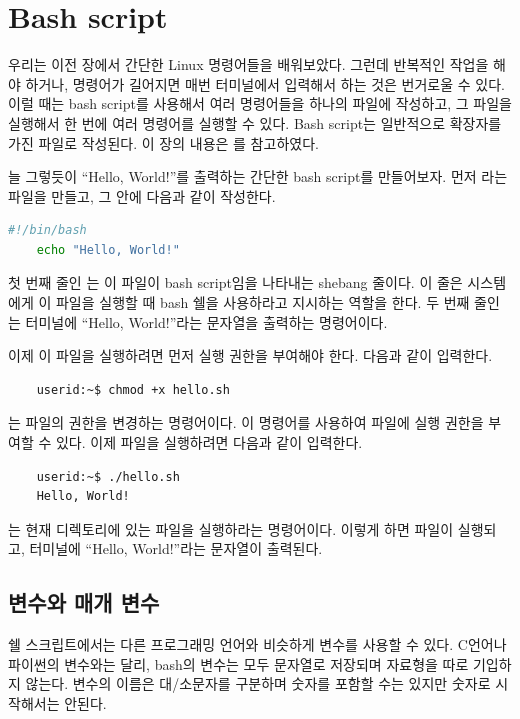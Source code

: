 {\section{Bash script}
우리는 이전 장에서 간단한 Linux 명령어들을 배워보았다. 그런데 반복적인 작업을 해야 하거나, 명령어가 길어지면 매번 터미널에서 입력해서 하는 것은 번거로울 수 있다. 이럴 때는 bash script를 사용해서 여러 명령어들을 하나의 파일에 작성하고, 그 파일을 실행해서 한 번에 여러 명령어를 실행할 수 있다. Bash script는 일반적으로  확장자를 가진 파일로 작성된다. 이 장의 내용은 \cite{inpa2022bash}를 참고하였다.

늘 그렇듯이 ``Hello, World!''를 출력하는 간단한 bash script를 만들어보자. 먼저 라는 파일을 만들고, 그 안에 다음과 같이 작성한다.
\begin{lstlisting}[language=bash, keywords={}]
    #!/bin/bash
    echo "Hello, World!"
\end{lstlisting}
첫 번째 줄인 는 이 파일이 bash script임을 나타내는 shebang 줄이다. 이 줄은 시스템에게 이 파일을 실행할 때 bash 쉘을 사용하라고 지시하는 역할을 한다. 두 번째 줄인 는 터미널에 ``Hello, World!''라는 문자열을 출력하는 명령어이다.

이제 이 파일을 실행하려면 먼저 실행 권한을 부여해야 한다. 다음과 같이 입력한다.
\begin{lstlisting}
    userid:~$ chmod +x hello.sh
\end{lstlisting}
는 파일의 권한을 변경하는 명령어이다. 이 명령어를 사용하여  파일에 실행 권한을 부여할 수 있다. 이제  파일을 실행하려면 다음과 같이 입력한다.
\begin{lstlisting}
    userid:~$ ./hello.sh
    Hello, World!
\end{lstlisting}
는 현재 디렉토리에 있는  파일을 실행하라는 명령어이다. 이렇게 하면  파일이 실행되고, 터미널에 ``Hello, World!''라는 문자열이 출력된다.

\subsection{변수와 매개 변수}

쉘 스크립트에서는 다른 프로그래밍 언어와 비슷하게 변수를 사용할 수 있다. C언어나 파이썬의 변수와는 달리, bash의 변수는 모두 문자열로 저장되며 자료형을 따로 기입하지 않는다. 변수의 이름은 대/소문자를 구분하며 숫자를 포함할 수는 있지만 숫자로 시작해서는 안된다.

}
